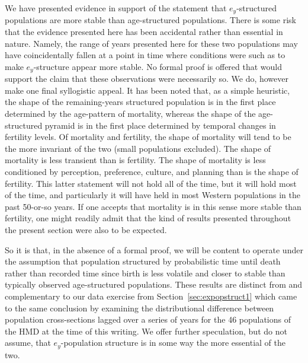 We have presented evidence in support of the statement that $e_y$-structured
populations are more stable than age-structured populations. There is some
risk that the evidence presented here has been accidental rather
than essential in nature. Namely, the range of years presented here for these
two populations may have coincidentally fallen at a point in time where
conditions were such as to make $e_y$-structure appear more stable. No formal
proof is offered that would support the claim that these observations were
necessarily so. We do, however make one final syllogistic appeal. It has been
noted that, as a simple heuristic, the shape of the remaining-years structured
population is in the first place determined by the age-pattern of mortality,
whereas the shape of the age-structured pyramid is in the first place
determined by temporal changes in fertility levels. Of mortality and
fertility, the shape of mortality will tend to be the more invariant of the two
(small populations excluded). The shape of mortality is less transient than is
fertility. The shape of mortality is less conditioned by perception, preference, 
culture, and planning than is the shape of fertility. This latter statement will
not hold all of the time, but it will hold most of the time, and particularly it
will have held in most Western populations in the past 50-or-so years. If one
accepts that mortality is in this sense more stable than fertility, one might
readily admit that the kind of results presented throughout the present section
were also to be expected. 

So it is that, in the absence of a formal proof, we
will be content to operate under the assumption that population structured by 
probabilistic time until death rather than recorded time since birth is less
volatile and closer to stable than typically observed age-structured
populations. These results are distinct from and complementary to our data
exercise from Section~\ref{sec:expopstruct1} which came to the same conclusion by examining
the distributional difference between population cross-sections lagged over a
series of years for the 46 populations of the HMD at the time of this
writing. We offer further speculation, but do not assume, that $e_y$-population structure is in some way the more essential of the two.

